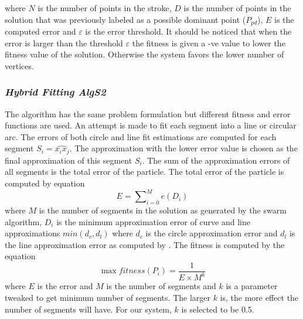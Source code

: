 \documentclass[preprint,1p,times,review]{elsarticle}
\begin{document}
   where $N$ is the number of points in the stroke, $D$ is the number of points in the solution that was previously labeled as a possible dominant point ($P_{pd}$), $E$ is the computed error and $\varepsilon$ is the error threshold. It should be noticed that when the error is larger than the threshold $\varepsilon$ the fitness is given a -ve value to lower the fitness value of the solution. Otherwise the system favors the lower number of vertices.

 \subsubsection{\textit{Hybrid Fitting \textsl{AlgS2}}}
 The algorithm has the same problem formulation but different fitness and error functions are used. An attempt is made to fit each segment into a line or circular arc. The errors of both circle and line fit estimations are computed for each segment $S_i=\widehat{x_ix_j}$. The approximation with the lower error value is chosen as the final approximation of this segment $S_i$\cite{CruveDivisionSwarm}. The sum of the approximation errors of all segments is the total error of the particle.  The total error of the particle is computed by equation %
 \begin{equation}
E=\sum\nolimits_{i = 0}^M e(D_i)
\label{eq:errorSwarm2}
\end{equation}where $M$ is the number of segments in the solution as generated
by the swarm algorithm, $D_i$ is the minimum approximation error of curve and
line approximations $min(d_c,d_l)$ where $d_c$ is the circle approximation error
and $d_l$ is the line approximation error as computed by
\cite{CruveDivisionSwarm}.  The fitness is computed by the equation
\begin{equation}
\max fitness(P_i ) = \frac{1}{{E \times M^k }}
\label{eq:fitnessSwarm2}
\end{equation} where $E$ is the error and $M$ is the number of segments and $k$
is a parameter tweaked to get minimum number of segments. The larger $k$ is, the
more effect the number of segments will have. For our system, $k$ is selected to
be 0.5\cite{CruveDivisionSwarm}.
\end{document}
